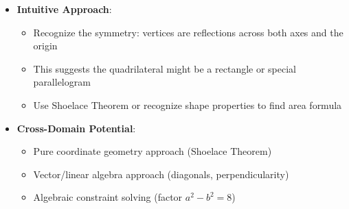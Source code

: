 \documentclass[]{article}
\begin{document}
\begin{problemconfigbox}
\begin{itemize}[leftmargin=*]
    \item \textbf{Intuitive Approach}: 
    \begin{itemize}
        \item Recognize the symmetry: vertices are reflections across both axes and the origin
        \item This suggests the quadrilateral might be a rectangle or special parallelogram
        \item Use Shoelace Theorem or recognize shape properties to find area formula
    \end{itemize}
    
    \item \textbf{Cross-Domain Potential}: 
    \begin{itemize}
        \item Pure coordinate geometry approach (Shoelace Theorem)
        \item Vector/linear algebra approach (diagonals, perpendicularity)
        \item Algebraic constraint solving (factor $a^2 - b^2 = 8$)
    \end{itemize}
\end{itemize}
\end{problemconfigbox}
\end{document}
